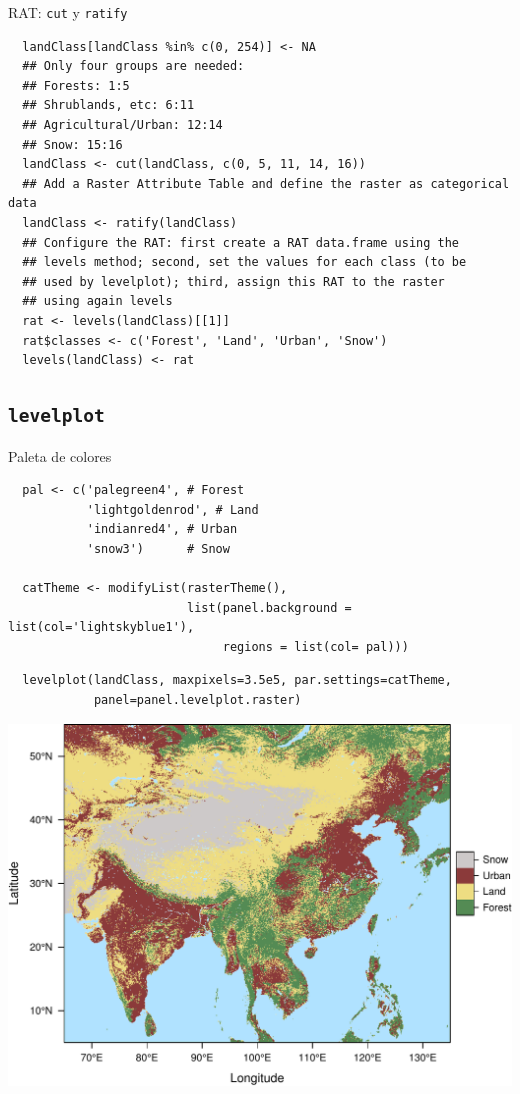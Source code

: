 \documentclass[xcolor={usenames,svgnames,dvipsnames}]{beamer}
\begin{document}
\begin{frame}[fragile,label=sec-3-1-2]{RAT: \texttt{cut} y \texttt{ratify}}
 \lstset{language=R,label= ,caption= ,numbers=none}
\begin{lstlisting}
  landClass[landClass %in% c(0, 254)] <- NA
  ## Only four groups are needed:
  ## Forests: 1:5
  ## Shrublands, etc: 6:11
  ## Agricultural/Urban: 12:14
  ## Snow: 15:16
  landClass <- cut(landClass, c(0, 5, 11, 14, 16))
  ## Add a Raster Attribute Table and define the raster as categorical data
  landClass <- ratify(landClass)
  ## Configure the RAT: first create a RAT data.frame using the
  ## levels method; second, set the values for each class (to be
  ## used by levelplot); third, assign this RAT to the raster
  ## using again levels
  rat <- levels(landClass)[[1]]
  rat$classes <- c('Forest', 'Land', 'Urban', 'Snow')
  levels(landClass) <- rat
\end{lstlisting}
\end{frame}

\subsection{\texttt{levelplot}}
\label{sec-3-2}

\begin{frame}[fragile,label=sec-3-2-1]{Paleta de colores}
 \lstset{language=R,label= ,caption= ,numbers=none}
\begin{lstlisting}
  pal <- c('palegreen4', # Forest
           'lightgoldenrod', # Land
           'indianred4', # Urban
           'snow3')      # Snow
  
  catTheme <- modifyList(rasterTheme(),
                         list(panel.background = list(col='lightskyblue1'),
                              regions = list(col= pal)))
\end{lstlisting}
\end{frame}
\begin{frame}[fragile,label=sec-3-2-2]{}
 \lstset{language=R,label= ,caption= ,numbers=none}
\begin{lstlisting}
  levelplot(landClass, maxpixels=3.5e5, par.settings=catTheme,
            panel=panel.levelplot.raster)
\end{lstlisting}

\includegraphics[width=.9\linewidth]{figs/landClass.pdf}
\end{frame}
\end{document}

